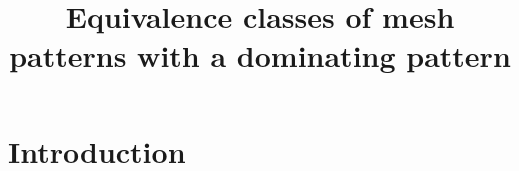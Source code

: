 \documentclass[11pt, a4paper]{amsart}
\title{Equivalence classes of mesh patterns with a dominating pattern}
\begin{document}

\maketitle
\thispagestyle{empty}
\section{Introduction}


\printbibliography
\end{document}
